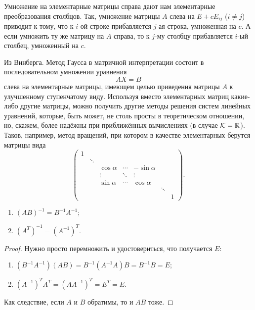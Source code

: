 Умножение на элементарные матрицы справа дают нам элементарные преобразования столбцов. Так, умножение матрицы $A$ слева на $E + cE_{ij}$ ($i \ne j$) приводит к тому, что к $i$-ой строке прибавляется $j$-ая строка, умноженная на $c$. А если умножить ту же матрицу на $A$ справа, то к $j$-му столбцу прибавляется $i$-ый столбец, умноженный на $c$.

\begin{remark}
    Из Винберга. Метод Гаусса в матричной интерпретации состоит в последовательном умножении уравнения
    $$
    AX = B
    $$
    слева на элементарные матрицы, имеющем целью приведения матрицы $A$ к улучшенному ступенчатому виду. Используя вместо элементарных матриц какие-либо другие матрицы, можно получить другие методы решения систем линейных уравнений, которые, быть может, не столь просты в теоретическом отношении, но, скажем, более надёжны при приближённых вычислениях (в случае $\mathcal{K} = \mathbb{R}$). Таков, например, метод вращений, при котором в качестве элементарных берутся матрицы вида
    $$
    \begin{pmatrix}
        1 & {} & {} & {} & {} & {} & {}\\
        {} & \ddots & {} & {} & {} & {} & {}\\
        {} & {} & \cos\alpha & \cdots & -\sin\alpha & {} & {}\\
        {} & {} & \vdots & \ddots & \vdots & {} & {}\\
        {} & {} & \sin\alpha & \cdots & \cos\alpha & {} & {}\\
        {} & {} & {} & {} & {} & \ddots & {}\\
        {} & {} & {} & {} & {} & {} & 1
    \end{pmatrix}.
    $$
\end{remark}

\begin{statement}
    \begin{enumerate}[nolistsep]
        \item $(AB)^{-1} = B^{-1}A^{-1}$;
        \item $(A^T)^{-1} = (A^{-1})^T$.
    \end{enumerate}
\end{statement}

\begin{proof}
    Нужно просто перемножить и удостовериться, что получается $E$:
    \begin{enumerate}
        \item $(B^{-1}A^{-1})(AB) = B^{-1}(A^{-1}A)B = B^{-1}B = E$;
        \item $(A^{-1})^TA^T = (AA^{-1})^T = E^T = E$.
    \end{enumerate}

    Как следствие, если $A$ и $B$ обратимы, то и $AB$ тоже.
\end{proof}


